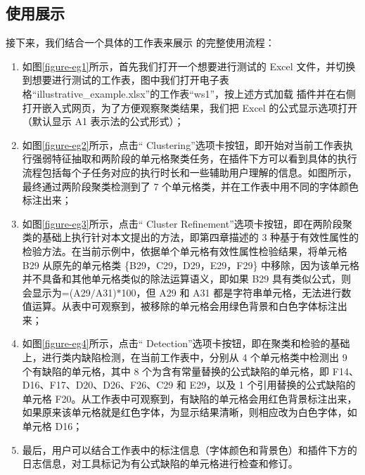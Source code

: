 \subsection{使用展示}
接下来，我们结合一个具体的工作表来展示 \eg 的完整使用流程：
\begin{enumerate}
    \item 如图\ref{figure-eg1}所示，首先我们打开一个想要进行测试的 Excel 文件，并切换到想要进行测试的工作表，图中我们打开电子表格“illustrative\_example.xlsx”的工作表“ws1”，按上述方式加载 \eg 插件并在右侧打开嵌入式网页，为了方便观察聚类结果，我们把 Excel 的公式显示选项打开（默认显示 A1 表示法的公式形式）；
    
    \item 如图\ref{figure-eg2}所示，点击“ Clustering”选项卡按钮，即开始对当前工作表执行强弱特征抽取和两阶段的单元格聚类任务，在插件下方可以看到具体的执行流程包括每个子任务对应的执行时长和一些辅助用户理解的信息。如图所示，最终通过两阶段聚类检测到了 7 个单元格类，并在工作表中用不同的字体颜色标注出来；
    
    \item 如图\ref{figure-eg3}所示，点击“ Cluster Refinement”选项卡按钮，即在两阶段聚类的基础上执行针对本文提出的\wa 方法，即第四章描述的 3 种基于有效性属性的检验方法。在当前示例中，依据单个单元格有效性属性检验结果，将单元格 B29 从原先的单元格类 \{B29，C29，D29，E29，F29\} 中移除，因为该单元格并不具备和其他单元格类似的除法运算语义，即如果 B29 具有类似公式，则会显示为=(A29$/$A31)$*$100，但 A29 和 A31 都是字符串单元格，无法进行数值运算。从表中可观察到，被移除的单元格会用绿色背景和白色字体标注出来；
    
    \item 如图\ref{figure-eg4}所示，点击“ Detection”选项卡按钮，即在聚类和检验的基础上，进行类内缺陷检测，在当前工作表中，分别从 4 个单元格类中检测出 9 个有缺陷的单元格，其中 8 个为含有常量替换的公式缺陷的单元格，即 F14、D16、F17、D20、D26、F26、C29 和 E29，以及 1 个引用替换的公式缺陷的单元格 F20。从工作表中可观察到，有缺陷的单元格会用红色背景标注出来，如果原来该单元格就是红色字体，为显示结果清晰，则相应改为白色字体，如单元格 D16；
    
    \item 最后，用户可以结合工作表中的标注信息（字体颜色和背景色）和插件下方的日志信息，对工具标记为有公式缺陷的单元格进行检查和修订。
\end{enumerate}


